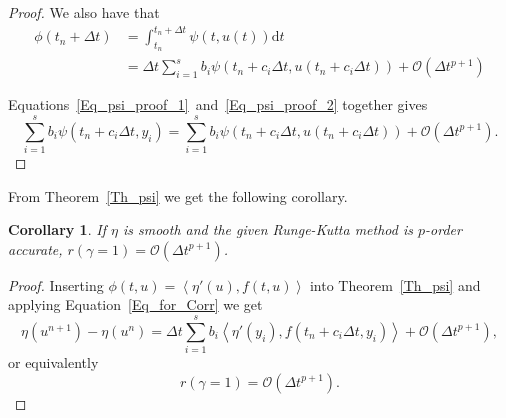 \documentclass{article}
\newtheorem{corollary}[theorem]{Corollary}
\newcommand{\inner}[2]{\left< #1 , #2 \right>}
\begin{document}
\begin{proof}
    We also have that
    \begin{align}
        \phi(t_n + \Delta t) &= \int_{t_n}^{t_n + \Delta t} \psi(t, u(t))\text{d}t \nonumber \\
        &= \Delta t \sum_{i=1}^{s}b_i\psi(t_n + c_i\Delta t, u(t_n + c_i \Delta t)) + \mathcal{O}(\Delta t^{p+1}) \label{Eq_psi_proof_2}
    \end{align}

    Equations~\ref{Eq_psi_proof_1}~and~\ref{Eq_psi_proof_2} together gives
    \[\sum_{i=1}^{s}b_i\psi(t_n + c_i \Delta t, y_i) = \sum_{i=1}^{s}b_i\psi(t_n + c_i\Delta t, u(t_n + c_i \Delta t)) + \mathcal{O}(\Delta t^{p+1}).\]

    \end{proof}

    From Theorem~\ref{Th_psi} we get the following corollary.
    \begin{corollary}\label{Corr_gamma}
        If \(\eta\) is smooth and the given Runge-Kutta method is \(p\)-order accurate, \(r(\gamma = 1) = \mathcal{O}(\Delta t^{p+1})\).
    \end{corollary}
    \begin{proof}
        Inserting \(\phi(t,u) = \inner{\eta'(u)}{f(t,u)}\) into Theorem~\ref{Th_psi} and applying Equation~\ref{Eq_for_Corr} we get
        \[\eta(u^{n+1}) - \eta(u^n) = \Delta t \sum_{i=1}^{s} b_i \inner{\eta'(y_i)}{f(t_n + c_i\Delta t, y_i)} + \mathcal{O}(\Delta t^{p+1}),\]
        or equivalently
        \[r(\gamma = 1) = \mathcal{O}(\Delta t^{p+1}).\]
    \end{proof}
\end{document}
